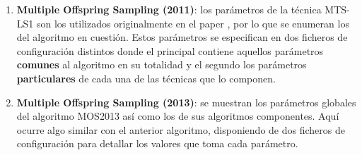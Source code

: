 \begin{enumerate}
	\item \textbf{Multiple Offspring Sampling (2011)}: los parámetros de la técnica MTS-LS1 son los utilizados originalmente en el paper \cite{MTS-LSGO}, por lo que se enumeran los del algoritmo en cuestión. Estos parámetros se especifican en dos ficheros de configuración distintos donde el principal contiene aquellos parámetros \textbf{comunes} al algoritmo en su totalidad y el segundo los parámetros \textbf{particulares} de cada una de las técnicas que lo componen.
	
	\begin{table}[H]
		\centering
		\caption{Parámetros de MOS 2011} \label{tabla:MOS2011Params}
	\end{table}
		
	\item \textbf{Multiple Offspring Sampling (2013)}: se muestran los parámetros globales del algoritmo MOS2013 así como los de sus algoritmos componentes. Aquí ocurre algo similar con el anterior algoritmo, disponiendo de dos ficheros de configuración para detallar los valores que toma cada parámetro.
	
		\begin{table}[H]
			\centering
		\caption{Parámetros de MOS 2013} \label{tabla:MOS2013Params}
		\end{table}
	

\end{enumerate}
